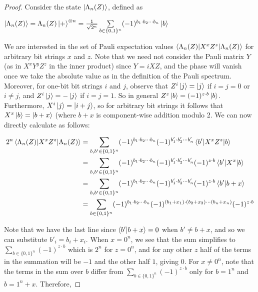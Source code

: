 \documentclass[12pt]{dalthesis}
\begin{document}
\begin{proof}
Consider the state $\ket{\Lambda_n (Z)}$, defined as 
\begin{center}
$\ket{\Lambda_n (Z)} = \Lambda_n (Z)\ket{+}^{\otimes n} = \frac{1}{\sqrt{2^n}} \sum\limits_{b \in \{0, 1\}^n} (-1)^{b_1 \cdot b_2 \cdots b_n} \ket{b}$
\end{center}
We are interested in the set of Pauli expectation values $\braket{\Lambda_n (Z)|X^xZ^z|\Lambda_n (Z)}$ for arbitrary bit strings $x$ and $z$. Note that we need not consider the Pauli matrix $Y$ (as in $X^xY^yZ^z$ in the inner product) since $Y = iXZ$, and the phase will vanish once we take the absolute value as in the definition of the Pauli spectrum. Moreover, for one-bit bit strings $i$ and $j$, observe that $Z^i \ket{j} = \ket{j}$ if $i=j=0$ or $i \neq j$, and $Z^i \ket{j} = -\ket{j}$ if $i=j=1$. So in general $Z^z \ket{b} = (-1)^{z \cdot b}\ket{b}$. Furthermore, $X^i \ket{j} = \ket{i+j}$, so for arbitrary bit strings it follows that $X^x\ket{b} = \ket{b + x}$ (where $b+x$ is component-wise addition modulo 2. We can now directly calculate as follows:

\begin{equation}
\begin{split}
2^n\braket{\Lambda_n (Z)|X^xZ^z|\Lambda_n (Z)} & = \sum\limits_{b, b' \in \{0, 1\}^n} (-1)^{b_1 \cdot b_2 \cdots b_n} (-1)^{b'_1 \cdot b'_2 \cdots b'_n} \braket{b'|X^xZ^z|b} \\
& = \sum\limits_{b, b' \in \{0, 1\}^n} (-1)^{b_1 \cdot b_2 \cdots b_n} (-1)^{b'_1 \cdot b'_2 \cdots b'_n} (-1)^{z \cdot b} \braket{b'|X^x|b} \\
& = \sum\limits_{b, b' \in \{0, 1\}^n} (-1)^{b_1 \cdot b_2 \cdots b_n} (-1)^{b'_1 \cdot b'_2 \cdots b'_n} (-1)^{z \cdot b} \braket{b'|b + x} \\
& = \sum\limits_{b \in \{0, 1\}^n} (-1)^{b_1 \cdot b_2 \cdots b_n} (-1)^{(b_1 + x_1) \cdot (b_2 + x_2) \cdots (b_n + x_n)} (-1)^{z \cdot b}
\end{split}
\end{equation}


Note that we have the last line since $\braket{b'|b+x} = 0$ when $b' \neq b + x$, and so we can substitute $b'_i = b_i + x_i$. When $x=0^n$, we see that the sum simplifies to $\sum_{b \in \{0, 1\}^n} (-1)^{z \cdot b}$ which is $2^n$ for $z=0^n$, and for any other $z$ half of the terms in the summation will be $-1$ and the other half $1$, giving $0$. For $x \neq 0^n$, note that the terms in the sum over $b$ differ from $\sum_{b \in \{0, 1\}^n} (-1)^{z \cdot b}$ only for $b = 1^n$ and $b = 1^n + x$. Therefore,


\end{proof}
\end{document}
